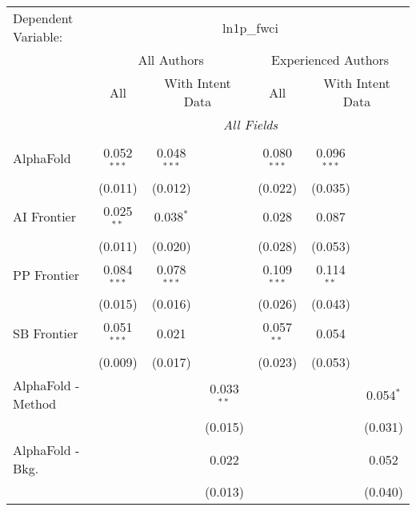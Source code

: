 \begingroup
\centering
\begin{tabular}{lcccccc}
   \tabularnewline \midrule \midrule
   Dependent Variable: & \multicolumn{6}{c}{ln1p\_fwci}\\
 & \multicolumn{3}{c}{All Authors} & \multicolumn{3}{c}{Experienced Authors} \\
\cmidrule(lr){2-4} \cmidrule(lr){5-7}
 & \multicolumn{1}{c}{All} & \multicolumn{2}{c}{With Intent Data} & \multicolumn{1}{c}{All} & \multicolumn{2}{c}{With Intent Data} \\
\cmidrule(lr){2-2} \cmidrule(lr){3-4} \cmidrule(lr){5-5} \cmidrule(lr){6-7}
 & \multicolumn{6}{c}{\textit{All Fields}} \\ \\
   AlphaFold            & 0.052$^{***}$ & 0.048$^{***}$ &                & 0.080$^{***}$ & 0.096$^{***}$ &   \\   
                        & (0.011)       & (0.012)       &                & (0.022)       & (0.035)       &   \\   
   AI Frontier          & 0.025$^{**}$  & 0.038$^{*}$   &                & 0.028         & 0.087         &   \\   
                        & (0.011)       & (0.020)       &                & (0.028)       & (0.053)       &   \\   
   PP Frontier          & 0.084$^{***}$ & 0.078$^{***}$ &                & 0.109$^{***}$ & 0.114$^{**}$  &   \\   
                        & (0.015)       & (0.016)       &                & (0.026)       & (0.043)       &   \\   
   SB Frontier          & 0.051$^{***}$ & 0.021         &                & 0.057$^{**}$  & 0.054         &   \\   
                        & (0.009)       & (0.017)       &                & (0.023)       & (0.053)       &   \\   
   AlphaFold - Method   &               &               & 0.033$^{**}$   &               &               & 0.054$^{*}$\\   
                        &               &               & (0.015)        &               &               & (0.031)\\   
   AlphaFold - Bkg.     &               &               & 0.022          &               &               & 0.052\\   
                        &               &               & (0.013)        &               &               & (0.040)\\   

\end{tabular}
